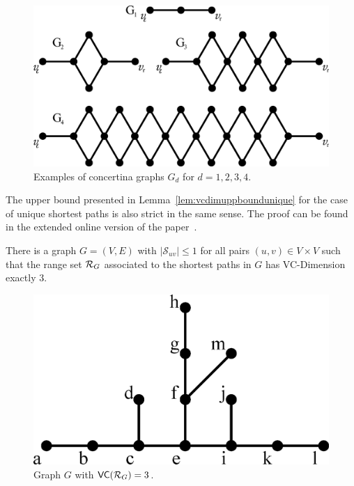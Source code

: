 \begin{figure}[th]
  \centering
  \includegraphics[scale=0.3]{figures/eps/tight}
  \caption{Examples of concertina graphs $G_d$ for $d=1,2,3,4$.}
  \label{fig:tightgraphs}
\end{figure}

The upper bound presented in Lemma~\ref{lem:vcdimuppboundunique}  for the case
of unique shortest paths is also strict in the same sense.
\ifproof
\else
The proof can be found in the extended online version of the
paper~\citep{RiondatoK13}.
\fi

\begin{lemma}\label{lem:vcdimlowboundunique}
  There is a graph $G=(V,E)$ with $|\mathcal{S}_{uv}|\le1$ for all
  pairs $(u,v)\in V\times V$ such that the range set $\mathcal{R}_G$ associated to the
  shortest paths in $G$ has VC-Dimension exactly $3$.
\end{lemma}

\ifproof
\begin{figure}[ht]
  \centering
  \includegraphics[scale=0.35]{figures/eps/uniqueshortestpathtight}
  \caption{Graph $G$ with $\mathsf{VC}(\mathcal{R}_G)= 3$.}
  \label{fig:uniquetight}
\end{figure}

